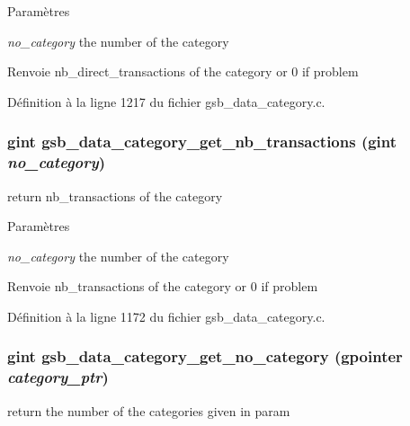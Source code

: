 \begin{DoxyParams}{Paramètres}
\item[{\em no\_\-category}]the number of the category\end{DoxyParams}
\begin{DoxyReturn}{Renvoie}
nb\_\-direct\_\-transactions of the category or 0 if problem 
\end{DoxyReturn}


Définition à la ligne 1217 du fichier gsb\_\-data\_\-category.c.

\subsubsection[{gsb\_\-data\_\-category\_\-get\_\-nb\_\-transactions}]{\setlength{\rightskip}{0pt plus 5cm}gint gsb\_\-data\_\-category\_\-get\_\-nb\_\-transactions (gint {\em no\_\-category})}\label{gsb__data__category_8c_a680b3ce8f52b52d129b7476030f28751}
return nb\_\-transactions of the category


\begin{DoxyParams}{Paramètres}
\item[{\em no\_\-category}]the number of the category\end{DoxyParams}
\begin{DoxyReturn}{Renvoie}
nb\_\-transactions of the category or 0 if problem 
\end{DoxyReturn}


Définition à la ligne 1172 du fichier gsb\_\-data\_\-category.c.

\subsubsection[{gsb\_\-data\_\-category\_\-get\_\-no\_\-category}]{\setlength{\rightskip}{0pt plus 5cm}gint gsb\_\-data\_\-category\_\-get\_\-no\_\-category (gpointer {\em category\_\-ptr})}\label{gsb__data__category_8c_ad96f1f1ae0532eb5ae3503a79dcaa64d}
return the number of the categories given in param


